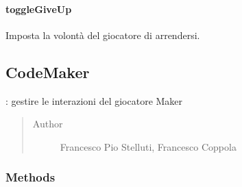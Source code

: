 \documentclass[letterpaper,10pt,italian,openany,oneside]{sphinxmanual}
\begin{document}
\paragraph{toggleGiveUp}
\label{\detokenize{source/it/unicam/cs/pa/mastermind/players/CodeBreaker:togglegiveup}}

\begin{fulllineitems}
\label{\detokenize{source/it/unicam/cs/pa/mastermind/players/CodeBreaker:it.unicam.cs.pa.mastermind.players.CodeBreaker.toggleGiveUp()}}
Imposta la volontà del giocatore  di arrendersi.

\end{fulllineitems}



\subsection{CodeMaker}
\label{\detokenize{source/it/unicam/cs/pa/mastermind/players/CodeMaker:codemaker}}\label{\detokenize{source/it/unicam/cs/pa/mastermind/players/CodeMaker::doc}}

\begin{fulllineitems}
\label{\detokenize{source/it/unicam/cs/pa/mastermind/players/CodeMaker:it.unicam.cs.pa.mastermind.players.CodeMaker}}
: gestire le interazioni del giocatore Maker
\begin{quote}\begin{description}
\item[{Author}] \leavevmode
Francesco Pio Stelluti, Francesco Coppola

\end{description}\end{quote}

\end{fulllineitems}



\subsubsection{Methods}
\label{\detokenize{source/it/unicam/cs/pa/mastermind/players/CodeMaker:methods}}
\end{document}
